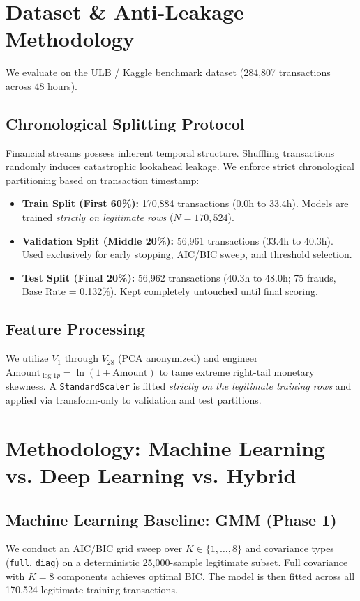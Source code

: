 \documentclass[conference]{IEEEtran}
\begin{document}
\section{Dataset \& Anti-Leakage Methodology}
We evaluate on the ULB / Kaggle benchmark dataset (284,807 transactions across 48 hours).

\subsection{Chronological Splitting Protocol}
Financial streams possess inherent temporal structure. Shuffling transactions randomly induces catastrophic lookahead leakage. We enforce strict chronological partitioning based on transaction timestamp:
\begin{itemize}
    \item \textbf{Train Split (First 60\%):} 170,884 transactions (0.0h to 33.4h). Models are trained \textit{strictly on legitimate rows} ($N = 170,524$).
    \item \textbf{Validation Split (Middle 20\%):} 56,961 transactions (33.4h to 40.3h). Used exclusively for early stopping, AIC/BIC sweep, and threshold selection.
    \item \textbf{Test Split (Final 20\%):} 56,962 transactions (40.3h to 48.0h; 75 frauds, Base Rate = 0.132\%). Kept completely untouched until final scoring.
\end{itemize}

\subsection{Feature Processing}
We utilize $V_1$ through $V_{28}$ (PCA anonymized) and engineer $\text{Amount}_{\log 1p} = \ln(1 + \text{Amount})$ to tame extreme right-tail monetary skewness. A \texttt{StandardScaler} is fitted \textit{strictly on the legitimate training rows} and applied via transform-only to validation and test partitions.

\section{Methodology: Machine Learning vs. Deep Learning vs. Hybrid}

\subsection{Machine Learning Baseline: GMM (Phase 1)}
We conduct an AIC/BIC grid sweep over $K \in \{1, \dots, 8\}$ and covariance types (\texttt{full}, \texttt{diag}) on a deterministic 25,000-sample legitimate subset. Full covariance with $K=8$ components achieves optimal BIC. The model is then fitted across all 170,524 legitimate training transactions.
\end{document}
